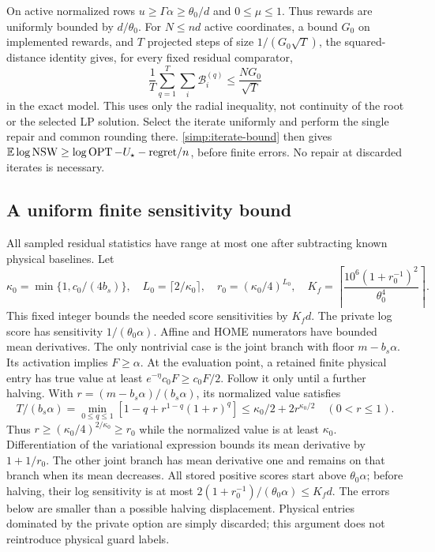 On active normalized rows $u\ge\Gamma\alpha\ge\theta_0/d$ and
$0\le\mu\le1$. Thus rewards are uniformly bounded by $d/\theta_0$.
For $N\le nd$ active coordinates, a bound $G_0$ on implemented rewards,
and $T$ projected steps of size $1/(G_0\sqrt T)$, the squared-distance
identity gives, for every fixed residual comparator,
\[
 \frac1T\sum_{q=1}^T\sum_i\mathcal B_i^{(q)}\le\frac{NG_0}{\sqrt T}
\]
in the exact model. This uses only the radial inequality, not continuity
of the root or the selected LP solution. Select the iterate uniformly
and perform the single repair and common rounding there.
\eqref{simp:iterate-bound} then gives
$\mathbb E\log\operatorname{NSW}\ge\log\operatorname{OPT}-U_\star-\text{regret}/n$,
before finite errors. No repair at discarded iterates is necessary.

\subsection{A uniform finite sensitivity bound}

All sampled residual statistics have range at most one after subtracting
known physical baselines. Let
\[
 \kappa_0=\min\{1,c_0/(4b_s)\},\quad L_0=\lceil2/\kappa_0\rceil,
 \quad r_0=(\kappa_0/4)^{L_0},\quad
 K_f=\left\lceil\frac{10^6(1+r_0^{-1})^2}{\theta_0^4}\right\rceil.
\]
This fixed integer bounds the needed score sensitivities by $K_fd$.
The private log score has sensitivity $1/(\theta_0\alpha)$.
Affine and HOME numerators have bounded mean derivatives. The only
nontrivial case is the joint branch with floor $m-b_s\alpha$.
Its activation implies $F\ge\alpha$. At the evaluation point, a retained
finite physical entry has true value at least $e^{-\eta}c_0F\ge c_0F/2$.
Follow it only until a further halving. With
$r=(m-b_s\alpha)/(b_s\alpha)$, its normalized value satisfies
\[
 T/(b_s\alpha)=\min_{0\le q\le1}
       [1-q+r^{1-q}(1+r)^q]
       \le\kappa_0/2+2r^{\kappa_0/2}\quad(0<r\le1).
\]
Thus $r\ge(\kappa_0/4)^{2/\kappa_0}\ge r_0$ while the normalized
value is at least $\kappa_0$. Differentiation of the variational expression
bounds its mean derivative by $1+1/r_0$. The other joint branch has
mean derivative one and remains on that branch when its mean decreases.
All stored positive scores start above $\theta_0\alpha$; before halving,
their log sensitivity is at most
$2(1+r_0^{-1})/(\theta_0\alpha)\le K_fd$.
The errors below are smaller than a possible halving displacement.
Physical entries dominated by the private option are simply discarded;
this argument does not reintroduce physical guard labels.

